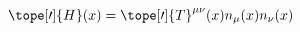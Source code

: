 \begin{equation}	\label{12.22}
\tope[\prime]{H}(x) = \tope[\prime]{T}^{\mu\nu}(x) n_\mu(x) n_\nu(x)
	\end{equation}

